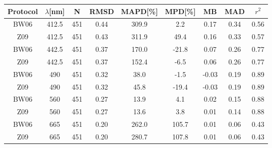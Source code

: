 \documentclass[preview]{standalone}
\begin{document}
\small

\begin{table}
\begin{tabular}{ccccccccc}

\hline
Protocol & $\lambda$[nm] & N & RMSD & MAPD[\%] & MPD[\%] & MB & MAD & $r^2$  \\\hline
 
BW06 & 412.5 & 451 & 0.44 & 309.9 & 2.2 & 0.17 & 0.34 & 0.56\\
Z09 & 412.5 & 451 & 0.43 & 311.9 & 49.4 & 0.16 & 0.33 & 0.57\\\hline

BW06 & 442.5 & 451 & 0.37 & 170.0 & -21.8 & 0.07 & 0.26 & 0.77\\
Z09 & 442.5 & 451 & 0.37 & 152.4 & -6.5 & 0.06 & 0.26 & 0.77\\\hline

BW06 & 490 & 451 & 0.32 & 38.0 & -1.5 & -0.03 & 0.19 & 0.89\\
Z09 & 490 & 451 & 0.32 & 45.8 & -19.4 & -0.03 & 0.19 & 0.89\\\hline

BW06 & 560 & 451 & 0.27 & 13.9 & 4.1 & 0.02 & 0.15 & 0.88\\
Z09 & 560 & 451 & 0.27 & 13.6 & 3.8 & 0.01 & 0.14 & 0.88\\\hline

BW06 & 665 & 451 & 0.20 & 262.0 & 105.7 & 0.01 & 0.06 & 0.43\\
Z09 & 665 & 451 & 0.20 & 280.7 & 107.8 & 0.01 & 0.06 & 0.43\\\hline


\end{tabular}
\end{table}
\end{document}
